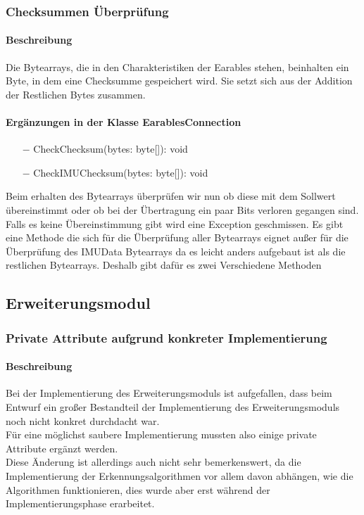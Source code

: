 \documentclass[a4paper,12pt]{article}
\begin{document}
\subsubsection{Checksummen Überprüfung}
\paragraph{Beschreibung}
Die Bytearrays, die in den Charakteristiken der Earables stehen, beinhalten ein Byte, in dem eine Checksumme gespeichert wird. Sie setzt sich aus der Addition der Restlichen Bytes zusammen. 

\paragraph{Ergänzungen in der Klasse EarablesConnection}
\begin{itemize}
	\item[$-$] CheckChecksum(bytes: byte[]): void
	\item[$-$] CheckIMUChecksum(bytes: byte[]): void
\end{itemize}
Beim erhalten des Bytearrays überprüfen wir nun ob diese mit dem Sollwert übereinstimmt oder ob bei der Übertragung ein paar Bits verloren gegangen sind. Falls es keine Übereinstimmung gibt wird eine Exception geschmissen. Es gibt eine Methode die sich für die Überprüfung aller Bytearrays eignet außer für die Überprüfung des IMUData Bytearrays da es leicht anders aufgebaut ist als die restlichen Bytearrays. Deshalb gibt dafür es zwei Verschiedene Methoden

\subsection{Erweiterungsmodul}


\subsubsection{Private Attribute aufgrund konkreter Implementierung}
\paragraph{Beschreibung}
Bei der Implementierung des Erweiterungsmoduls ist aufgefallen, dass beim Entwurf ein großer Bestandteil der Implementierung des Erweiterungsmoduls noch nicht konkret durchdacht war.\\
Für eine möglichst saubere Implementierung mussten also einige private Attribute ergänzt werden.\\ 
Diese Änderung ist allerdings auch nicht sehr bemerkenswert, da die Implementierung der Erkennungsalgorithmen vor allem davon abhängen, wie die Algorithmen funktionieren, dies wurde aber erst während der Implementierungsphase erarbeitet. \\
\end{document}
